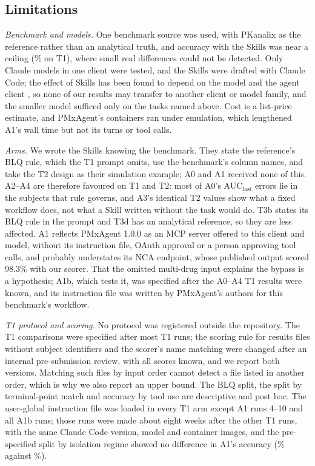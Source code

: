 \documentclass[11pt]{article}
\begin{document}
\subsection{Limitations}
\emph{Benchmark and models.} One benchmark source was used, with PKanalix as the reference rather than an analytical
truth, and accuracy with the Skills was near a ceiling (\numToneAthreeAcc\% on T1), where small real differences could
not be detected. Only Claude models in one client were tested, and the Skills were drafted with Claude Code; the effect
of Skills has been found to depend on the model and the agent client \cite{han2026sweskills}, so none of our results
may transfer to another client or model family, and the smaller model sufficed only on the tasks named above. Cost is a
list-price estimate, and PMxAgent's containers ran under emulation, which lengthened A1's wall time but not its turns or
tool calls.

\emph{Arms.} We wrote the Skills knowing the benchmark. They state the reference's BLQ rule, which the T1 prompt omits,
use the benchmark's column names, and take the T2 design as their simulation example; A0 and A1 received none of this.
A2--A4 are therefore favoured on T1 and T2: most of A0's AUC$_\mathrm{last}$ errors lie in the subjects that rule
governs, and A3's
identical T2 values show what a fixed workflow does, not what a Skill written without the task would do. T3b states its
BLQ rule in the prompt and T3d has an analytical reference, so they are less affected. A1 reflects PMxAgent 1.0.0 as an
MCP server offered to this client and model, without its instruction file, OAuth approval or a person approving tool
calls, and probably understates its NCA endpoint, whose published output scored 98.3\% with our scorer. That the omitted
multi-drug input explains the bypass is a hypothesis; A1b, which tests it, was specified after the A0--A4 T1 results were
known, and its instruction file was written by PMxAgent's authors for this benchmark's workflow.

\emph{T1 protocol and scoring.} No protocol was registered outside the repository. The T1 comparisons were specified
after most T1 runs; the scoring rule for results files without subject identifiers and the scorer's name matching were
changed after an internal pre-submission review, with all scores known, and we report both versions. Matching such
files by input order cannot detect a file listed in another order, which is why we also report an upper bound. The BLQ
split, the split by terminal-point match and accuracy by tool use are descriptive and post hoc. The user-global
instruction file was loaded in every T1 arm except A1 runs 4--10 and all A1b runs; those runs were made about eight
weeks after the other T1 runs, with the same Claude Code version, model and container images, and the pre-specified
split by isolation regime showed no difference in A1's accuracy (\numToneAoneAccIsolated\% against
\numToneAoneAccUser\%).
\end{document}
